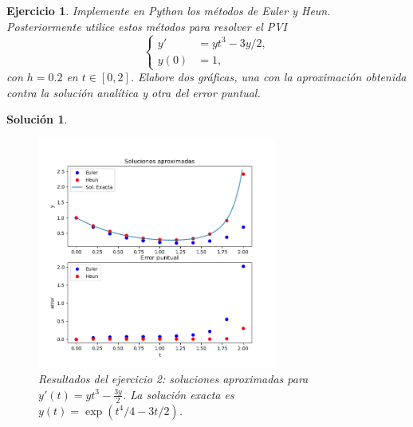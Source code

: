 \documentclass[11pt,letterpaper]{article}
\newtheorem{exercise}{Ejercicio}
\newtheorem*{sol}{Solución}
\begin{document}
\begin{exercise}
  Implemente en Python los métodos de Euler y Heun. Posteriormente
  utilice estos métodos para resolver el PVI
  \begin{equation}
    \left\{
      \begin{aligned}
        y' &= yt^{3} - 3y / 2, \\
        y(0) &= 1,
      \end{aligned}
    \right.
  \end{equation}
  con $h=0.2$ en $t\in [0,2]$. Elabore dos gráficas, una con la
  aproximación obtenida contra la solución analítica y otra del error
  puntual.
\end{exercise}
\begin{sol}
  \begin{figure}[ht]
    \centering
    \includegraphics[width=0.7\textwidth]{img/jaac_tarea1_ejercicio2}
    \caption{Resultados del ejercicio 2: soluciones aproximadas para
      $y'(t)=yt^{3}-\frac{3y}{2}$.
      La solución exacta es $y(t)=\exp(t^{4} / 4 - 3t / 2)$.}
    \label{fig:exe_1}
  \end{figure}
\end{sol}
\end{document}
